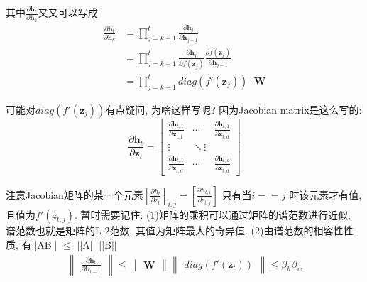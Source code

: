 \documentclass{article}
\begin{document}
其中$\frac{\partial \textbf{h}_t}{\partial \textbf{h}_k}$又又可以写成
\begin{align}
    \frac{\partial \textbf{h}_t}{\partial \textbf{h}_k} & = \prod_{j=k+1}^{t} \frac{\partial \textbf{h}_j}{\partial \textbf{h}_{j-1}}  \\
                                                        & = \prod_{j=k+1}^{t} \frac{\partial \textbf{h}_j}{\partial f(\textbf{z}_{j})}
    \frac{\partial f(\textbf{z}_{j})}{\partial \textbf{h}_{j-1}}                                                                       \\
                                                        & = \prod_{j=k+1}^{t} diag(f'(\textbf{z}_{j})) \cdot \textbf{W}
\end{align}

可能对$diag(f'(\textbf{z}_{j}))$有点疑问, 为啥这样写呢? 因为Jacobian matrix是这么写的:
\begin{equation*}
    \frac{\partial \textbf{h}_t}{\partial \textbf{z}_t} =
    \begin{bmatrix}
        \frac{\partial \textbf{h}_{t,1}}{\partial \textbf{z}_{t,1}} & \cdots        & \frac{\partial \textbf{h}_{t,1}}{\partial \textbf{z}_{t,d}} \\
        \vdots                                                      & \ddots \vdots                                                               \\
        \frac{\partial \textbf{h}_{t,1}}{\partial \textbf{z}_{t,d}} & \cdots        & \frac{\partial \textbf{h}_{t,d}}{\partial \textbf{z}_{t,d}}
    \end{bmatrix}
\end{equation*}

注意Jacobian矩阵的某一个元素$\left[\frac{\partial {h}_{t}}{\partial {z}_{t}}\right]_{i,j} = \left[\frac{\partial {h}_{t,i}}{\partial {z}_{t,j}}\right]$
只有当$i == j$ 时该元素才有值, 且值为$f'(z_{t,j})$. 
暂时需要记住: (1)矩阵的乘积可以通过矩阵的谱范数进行近似, 谱范数也就是矩阵的L-2范数, 其值为矩阵最大的奇异值.
(2)由谱范数的相容性性质, 有||AB|| $\leq$ ||A|| ||B||
\begin{align*}
    \begin{Vmatrix}
        \frac{\partial \textbf{h}_t}{\partial \textbf{h}_{t-1}}
    \end{Vmatrix}
    \leq
    \begin{Vmatrix}
        \textbf{W}
    \end{Vmatrix}
    \begin{Vmatrix}
        diag(f'( \textbf{z}_t ))
    \end{Vmatrix}
    \leq \beta_h \beta_w
\end{align*}
\end{document}
